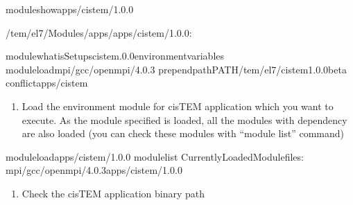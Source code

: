\documentclass[a4paper,10pt,english]{sphinxmanual}
\begin{document}
\begin{sphinxVerbatim}[commandchars=\\\{\}]
\PYGZdl{}\PYGZgt{}moduleshowapps/cistem/1.0.0

\PYGZhy{}\PYGZhy{}\PYGZhy{}\PYGZhy{}\PYGZhy{}\PYGZhy{}\PYGZhy{}\PYGZhy{}\PYGZhy{}\PYGZhy{}\PYGZhy{}\PYGZhy{}\PYGZhy{}\PYGZhy{}\PYGZhy{}\PYGZhy{}\PYGZhy{}\PYGZhy{}\PYGZhy{}\PYGZhy{}\PYGZhy{}\PYGZhy{}\PYGZhy{}\PYGZhy{}\PYGZhy{}\PYGZhy{}\PYGZhy{}\PYGZhy{}\PYGZhy{}\PYGZhy{}\PYGZhy{}\PYGZhy{}\PYGZhy{}\PYGZhy{}\PYGZhy{}\PYGZhy{}\PYGZhy{}\PYGZhy{}\PYGZhy{}\PYGZhy{}\PYGZhy{}\PYGZhy{}\PYGZhy{}\PYGZhy{}\PYGZhy{}\PYGZhy{}\PYGZhy{}\PYGZhy{}\PYGZhy{}\PYGZhy{}\PYGZhy{}\PYGZhy{}\PYGZhy{}\PYGZhy{}\PYGZhy{}\PYGZhy{}\PYGZhy{}\PYGZhy{}\PYGZhy{}\PYGZhy{}\PYGZhy{}\PYGZhy{}\PYGZhy{}\PYGZhy{}\PYGZhy{}\PYGZhy{}\PYGZhy{}
/tem/el7/Modules/apps/apps/cistem/1.0.0:

module\PYGZhy{}whatisSetupscistem.0.0environmentvariables
moduleloadmpi/gcc/openmpi/4.0.3
prepend\PYGZhy{}pathPATH/tem/el7/cistem\PYGZhy{}1.0.0\PYGZhy{}beta
conflictapps/cistem
\PYGZhy{}\PYGZhy{}\PYGZhy{}\PYGZhy{}\PYGZhy{}\PYGZhy{}\PYGZhy{}\PYGZhy{}\PYGZhy{}\PYGZhy{}\PYGZhy{}\PYGZhy{}\PYGZhy{}\PYGZhy{}\PYGZhy{}\PYGZhy{}\PYGZhy{}\PYGZhy{}\PYGZhy{}\PYGZhy{}\PYGZhy{}\PYGZhy{}\PYGZhy{}\PYGZhy{}\PYGZhy{}\PYGZhy{}\PYGZhy{}\PYGZhy{}\PYGZhy{}\PYGZhy{}\PYGZhy{}\PYGZhy{}\PYGZhy{}\PYGZhy{}\PYGZhy{}\PYGZhy{}\PYGZhy{}\PYGZhy{}\PYGZhy{}\PYGZhy{}\PYGZhy{}\PYGZhy{}\PYGZhy{}\PYGZhy{}\PYGZhy{}\PYGZhy{}\PYGZhy{}\PYGZhy{}\PYGZhy{}\PYGZhy{}\PYGZhy{}\PYGZhy{}\PYGZhy{}\PYGZhy{}\PYGZhy{}\PYGZhy{}\PYGZhy{}\PYGZhy{}\PYGZhy{}\PYGZhy{}\PYGZhy{}\PYGZhy{}\PYGZhy{}\PYGZhy{}\PYGZhy{}\PYGZhy{}\PYGZhy{}
\end{sphinxVerbatim}
\begin{enumerate}
%
\setcounter{enumi}{2}
\item {} 
\sphinxAtStartPar
Load the environment module for cisTEM  application which you want to execute. As the module specified is loaded, all the modules with dependency are also loaded (you can check these modules with “module list” command)

\end{enumerate}

\begin{sphinxVerbatim}[commandchars=\\\{\}]
\PYGZdl{}\PYGZgt{}moduleloadapps/cistem/1.0.0
\PYGZdl{}\PYGZgt{}modulelist
CurrentlyLoadedModulefiles:
mpi/gcc/openmpi/4.0.3apps/cistem/1.0.0
\end{sphinxVerbatim}
\begin{enumerate}
%
\setcounter{enumi}{3}
\item {} 
\sphinxAtStartPar
Check the cisTEM application binary path

\end{enumerate}
\end{document}

